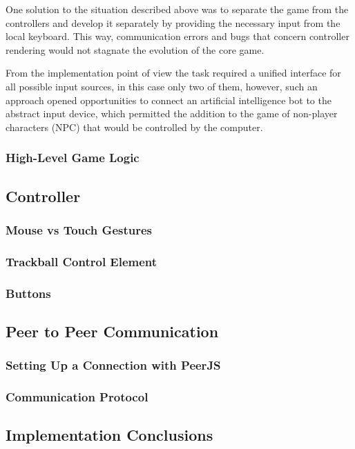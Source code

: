 One solution to the situation described above was to separate the game from the
controllers and develop it separately by providing the necessary input from the
local keyboard. This way, communication errors and bugs that concern controller
rendering would not stagnate the evolution of the core game.

From the implementation point of view the task required a unified interface for
all possible input sources, in this case only two of them, however, such an
approach opened opportunities to connect an artificial intelligence bot to the
abstract input device, which permitted the addition to the game of non-player
characters (NPC) that would be controlled by the computer.

\subsubsection{High-Level Game Logic}


\subsection{Controller}

\subsubsection{Mouse vs Touch Gestures}

\subsubsection{Trackball Control Element}

\subsubsection{Buttons}


\subsection{Peer to Peer Communication}

\subsubsection{Setting Up a Connection with PeerJS}

\subsubsection{Communication Protocol}

\subsection{Implementation Conclusions}

\clearpage
